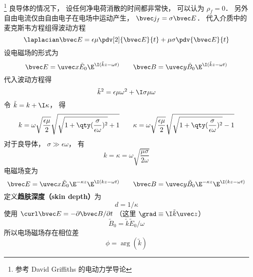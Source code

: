 
\footnote{参考 David Griffiths 的电动力学导论} 良导体的情况下， 设任何净电荷消散的时间都非常快， 可以认为 $\rho_f = 0$． 另外自由电流仅由自由电子在电场中运动产生， $\bvec j_f = \sigma \bvec E$． 代入介质中的麦克斯韦方程组得波动方程
\begin{equation}
\laplacian \bvec E = \epsilon \mu \pdv[2]{\bvec E}{t} + \mu\sigma \pdv{\bvec E}{t}
\end{equation}
设电磁场的形式为
\begin{equation}
\bvec E = \uvec x \tilde E_0 \E^{\I (\tilde k z - \omega t)}
\qquad
\bvec B = \uvec y \tilde B_0 \E^{\I (\tilde k z - \omega t)}
\end{equation}
代入波动方程得
\begin{equation}
\tilde k^2 = \epsilon\mu \omega^2 + \I \sigma \mu \omega
\end{equation}
令 $\tilde k = k + \I \kappa$， 得
\begin{equation}
k = \omega\sqrt{\frac{\epsilon\mu}{2}} \sqrt{\sqrt{1 + \qty(\frac{\sigma}{\epsilon\omega})^2} + 1}
\qquad
\kappa = \omega\sqrt{\frac{\epsilon\mu}{2}} \sqrt{\sqrt{1 + \qty(\frac{\sigma}{\epsilon\omega})^2} - 1}
\end{equation}
对于良导体， $\sigma \gg \epsilon\omega$， 有
\begin{equation}
k = \kappa = \omega \sqrt{\frac{\mu\sigma}{2\omega}}
\end{equation}
电磁场变为
\begin{equation}
\bvec E = \uvec x \tilde E_0 \E^{-\kappa z} \E^{\I (kz - \omega t)}
\qquad
\bvec B = \uvec y \tilde B_0 \E^{-\kappa z} \E^{\I (kz - \omega t)}
\end{equation}
定义\textbf{趋肤深度（skin depth）}为
\begin{equation}
d = 1/\kappa
\end{equation}
使用 $\curl \bvec E = -\partial \bvec B / \partial t$ （这里 $\grad \equiv \I \tilde k \uvec z$）
\begin{equation}
\tilde B_0 = \tilde k \tilde E_0 / \omega
\end{equation}
所以电场磁场存在相位差
\begin{equation}
\phi = \arg (\tilde k)
\end{equation}
